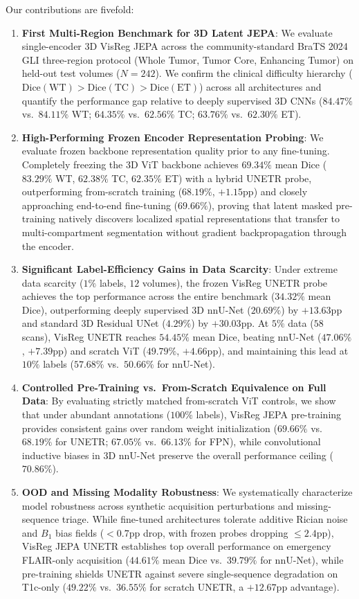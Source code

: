 \documentclass{article}
\begin{document}
Our contributions are fivefold:
\begin{enumerate}
    \item \textbf{First Multi-Region Benchmark for 3D Latent JEPA}: We evaluate single-encoder 3D VisReg JEPA across the community-standard BraTS 2024 GLI three-region protocol (Whole Tumor, Tumor Core, Enhancing Tumor) on held-out test volumes ($N=242$). We confirm the clinical difficulty hierarchy ($\text{Dice}(\text{WT}) > \text{Dice}(\text{TC}) > \text{Dice}(\text{ET})$) across all architectures and quantify the performance gap relative to deeply supervised 3D CNNs ($84.47\%$ vs.\ $84.11\%$ WT; $64.35\%$ vs.\ $62.56\%$ TC; $63.76\%$ vs.\ $62.30\%$ ET).
    \item \textbf{High-Performing Frozen Encoder Representation Probing}: We evaluate frozen backbone representation quality prior to any fine-tuning. Completely freezing the 3D ViT backbone achieves $69.34\%$ mean Dice ($83.29\%$ WT, $62.38\%$ TC, $62.35\%$ ET) with a hybrid UNETR probe, outperforming from-scratch training ($68.19\%$, $+1.15\text{pp}$) and closely approaching end-to-end fine-tuning ($69.66\%$), proving that latent masked pre-training natively discovers localized spatial representations that transfer to multi-compartment segmentation without gradient backpropagation through the encoder.
    \item \textbf{Significant Label-Efficiency Gains in Data Scarcity}: Under extreme data scarcity ($1\%$ labels, $12$ volumes), the frozen VisReg UNETR probe achieves the top performance across the entire benchmark ($34.32\%$ mean Dice), outperforming deeply supervised 3D nnU-Net ($20.69\%$) by $+13.63\text{pp}$ and standard 3D Residual UNet ($4.29\%$) by $+30.03\text{pp}$. At $5\%$ data ($58$ scans), VisReg UNETR reaches $54.45\%$ mean Dice, beating nnU-Net ($47.06\%$, $+7.39\text{pp}$) and scratch ViT ($49.79\%$, $+4.66\text{pp}$), and maintaining this lead at $10\%$ labels ($57.68\%$ vs.\ $50.66\%$ for nnU-Net).
    \item \textbf{Controlled Pre-Training vs.\ From-Scratch Equivalence on Full Data}: By evaluating strictly matched from-scratch ViT controls, we show that under abundant annotations ($100\%$ labels), VisReg JEPA pre-training provides consistent gains over random weight initialization ($69.66\%$ vs.\ $68.19\%$ for UNETR; $67.05\%$ vs.\ $66.13\%$ for FPN), while convolutional inductive biases in 3D nnU-Net preserve the overall performance ceiling ($70.86\%$).
    \item \textbf{OOD and Missing Modality Robustness}: We systematically characterize model robustness across synthetic acquisition perturbations and missing-sequence triage. While fine-tuned architectures tolerate additive Rician noise and $B_1$ bias fields ($<0.7\text{pp}$ drop, with frozen probes dropping $\le 2.4\text{pp}$), VisReg JEPA UNETR establishes top overall performance on emergency FLAIR-only acquisition ($44.61\%$ mean Dice vs.\ $39.79\%$ for nnU-Net), while pre-training shields UNETR against severe single-sequence degradation on T1c-only ($49.22\%$ vs.\ $36.55\%$ for scratch UNETR, a $+12.67\text{pp}$ advantage).
\end{enumerate}
\end{document}
